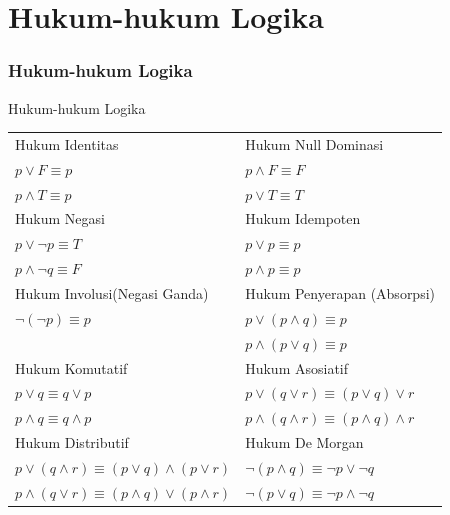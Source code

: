 \documentclass[handout]{beamer}
\theoremstyle{definition}
\theoremstyle{example}
\begin{document}
\section{Hukum-hukum Logika}
\begin{frame}
	\frametitle{Hukum-hukum Logika}
	\begin{block}{Hukum-hukum Logika}
	\small	
	   \begin{tabular}{ | l | l |}
	   	\hline
	   	 Hukum Identitas  & Hukum Null Dominasi  \\ 
	   	 $p\vee F \equiv p$  & $p\wedge F \equiv F$  \\  
	   	 $p\wedge T \equiv p$  &  $p\vee T \equiv T$ \\ \hline
	   	  Hukum Negasi & Hukum Idempoten \\	
	   	  $p\vee \neg p \equiv T$  & $p\vee p \equiv p$  \\  
	   	  $p\wedge \neg q \equiv F$  &  $p\wedge p \equiv p$ \\ \hline
	   	  Hukum Involusi(Negasi Ganda) & Hukum Penyerapan (Absorpsi) \\	
	   	  $\neg(\neg p) \equiv p$  & $p \vee (p \wedge q) \equiv p$  \\  
	   	                                 &  $p \wedge (p \vee q) \equiv p$ \\ \hline
	   	  Hukum Komutatif & Hukum Asosiatif \\	
	   	  $p \vee q \equiv q \vee p$  & $ p \vee (q \vee r) \equiv (p \vee q) \vee r$  \\  
	   	  $p \wedge q \equiv q \wedge p$  &  $ p \wedge (q \wedge r) \equiv (p \wedge q) \wedge r$ \\ \hline	
	   	 Hukum Distributif & Hukum De Morgan \\	
	   	 $p \vee (q \wedge r) \equiv (p \vee q)\wedge (p \vee r) $  & $ \neg(p \wedge q) \equiv \neg p \vee \neg q$  \\  
	   	 $p \wedge (q \vee r) \equiv (p \wedge q)\vee (p \wedge r)$  &  $ \neg(p \vee q) \equiv \neg p \wedge \neg q$ \\
	   	\hline
	   \end{tabular}
	\end{block}
\end{frame}
\end{document}
